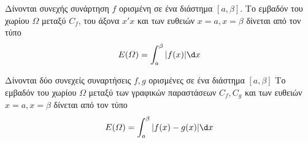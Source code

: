 Δίνονται συνεχής συνάρτηση $ f $ ορισμένη σε ένα διάστημα $ [a,\beta] $. Το εμβαδόν του χωρίου $ \varOmega $ μεταξύ $ C_f $, του άξονα $x'x$ και των ευθειών $ x=a,x=\beta $ δίνεται από τον τύπο
\[ E(\varOmega)=\int_{a}^{\beta}{|f(x)|\d x} \]

Δίνονται δύο συνεχείς συναρτήσεις $ f,g $ ορισμένες σε ένα διάστημα $ [a,\beta] $ Το εμβαδόν του χωρίου $ \varOmega $ μεταξύ των γραφικών παραστάσεων $ C_f,C_g $ και των ευθειών $ x=a,x=\beta $ δίνεται από τον τύπο
\[ E(\varOmega)=\int_{a}^{\beta}{|f(x)-g(x)|\d x} \]
